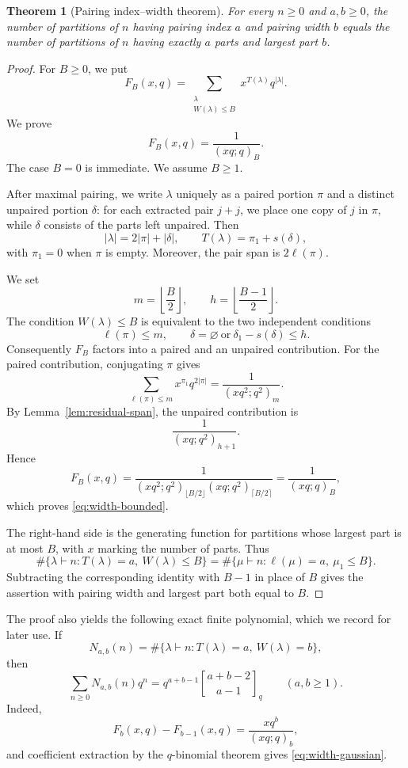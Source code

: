 \documentclass[11pt]{article}
\newtheorem{theorem}{Theorem}[section]
\theoremstyle{definition}
\theoremstyle{remark}
\newcommand{\qbinom}[3][]{%
  \genfrac{[}{]}{0pt}{}{#2}{#3}_{#1}%
}
\begin{document}
\begin{theorem}[Pairing index--width theorem]\label{thm:index-width}
For every $n\geq0$ and $a,b\geq0$, the number of partitions of $n$ having
pairing index $a$ and pairing width $b$ equals the number of partitions
of $n$ having exactly $a$ parts and largest part $b$.
\end{theorem}

\begin{proof}
For $B\geq0$, we put
\[
 F_B(x,q)=\sum_{\substack{\lambda\\W(\lambda)\leq B}}
 x^{T(\lambda)}q^{|\lambda|}.
\]
We prove
\begin{equation}\label{eq:width-bounded}
 F_B(x,q)=\frac{1}{(xq;q)_B}.
\end{equation}
The case $B=0$ is immediate.  We assume $B\geq1$.

After maximal pairing, we write $\lambda$ uniquely as a paired portion $\pi$
and a distinct unpaired portion $\delta$: for each extracted pair $j+j$,
we place one copy of $j$ in $\pi$, while $\delta$ consists of the parts left
unpaired.  Then
\[
 |\lambda|=2|\pi|+|\delta|,
 \qquad
 T(\lambda)=\pi_1+s(\delta),
\]
with $\pi_1=0$ when $\pi$ is empty.  Moreover, the pair span is
$2\ell(\pi)$.

We set
\[
 m=\left\lfloor\frac B2\right\rfloor,
 \qquad
 h=\left\lfloor\frac{B-1}{2}\right\rfloor.
\]
The condition $W(\lambda)\leq B$ is equivalent to the two independent
conditions
\[
 \ell(\pi)\leq m,
 \qquad
 \delta=\varnothing\ \text{or}\ 
 \delta_1-s(\delta)\leq h.
\]
Consequently $F_B$ factors into a paired and an unpaired contribution.
For the paired contribution, conjugating $\pi$ gives
\[
 \sum_{\ell(\pi)\leq m}x^{\pi_1}q^{2|\pi|}
 =\frac{1}{(xq^2;q^2)_m}.
\]
By Lemma~\ref{lem:residual-span}, the unpaired contribution is
\[
 \frac{1}{(xq;q^2)_{h+1}}.
\]
Hence
\[
 F_B(x,q)
 =\frac{1}{(xq^2;q^2)_{\lfloor B/2\rfloor}
            (xq;q^2)_{\lceil B/2\rceil}}
 =\frac{1}{(xq;q)_B},
\]
which proves \eqref{eq:width-bounded}.

The right-hand side is the generating function for partitions whose largest
part is at most $B$, with $x$ marking the number of parts.  Thus
\[
 \#\{\lambda\vdash n:T(\lambda)=a,\ W(\lambda)\leq B\}
 =\#\{\mu\vdash n:\ell(\mu)=a,\ \mu_1\leq B\}.
\]
Subtracting the corresponding identity with $B-1$ in place of $B$ gives the
assertion with pairing width and largest part both equal to $B$.
\end{proof}

The proof also yields the following exact finite polynomial, which we record for later use.
If
\[
 N_{a,b}(n)=\#\{\lambda\vdash n:T(\lambda)=a,\ W(\lambda)=b\},
\]
then
\begin{equation}\label{eq:width-gaussian}
 \sum_{n\geq0}N_{a,b}(n)q^n
 =q^{a+b-1}\qbinom[q]{a+b-2}{a-1}
 \qquad(a,b\geq1).
\end{equation}
Indeed,
\[
 F_b(x,q)-F_{b-1}(x,q)
 =\frac{xq^b}{(xq;q)_b},
\]
and coefficient extraction by the $q$-binomial theorem gives
\eqref{eq:width-gaussian}.
\end{document}
